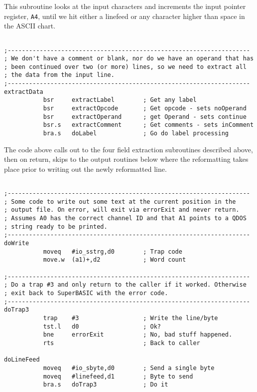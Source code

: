 This subroutine looks at the input characters and increments the input pointer register, \texttt{A4}, until we hit either a linefeed or any character higher than space in the ASCII chart.

\begin{lstlisting}[firstnumber=last,caption={ASMReformat Source - Main Extraction Control Code}]

;--------------------------------------------------------------------
; We don't have a comment or blank, nor do we have an operand that has
; been continued over two (or more) lines, so we need to extract all
; the data from the input line.
;--------------------------------------------------------------------
extractData
           bsr     extractLabel        ; Get any label
           bsr     extractOpcode       ; Get opcode - sets noOperand
           bsr     extractOperand      ; get Operand - sets continue
           bsr.s   extractComment      ; Get comments - sets inComment
           bra.s   doLabel             ; Go do label processing
\end{lstlisting}

The code above calls out to the four field extraction subroutines described above, then on return, skips to the output routines below where the reformatting takes place prior to writing out the newly reformatted line.

\begin{lstlisting}[firstnumber=last,caption={ASMReformat Source - Trap \#3 Code}]

;--------------------------------------------------------------------
; Some code to write out some text at the current position in the
; output file. On error, will exit via errorExit and never return.
; Assumes A0 has the correct channel ID and that A1 points to a QDOS
; string ready to be printed.
;--------------------------------------------------------------------
doWrite
           moveq   #io_sstrg,d0        ; Trap code
           move.w  (a1)+,d2            ; Word count

;--------------------------------------------------------------------
; Do a trap #3 and only return to the caller if it worked. Otherwise
; exit back to SuperBASIC with the error code.
;--------------------------------------------------------------------
doTrap3
           trap    #3                  ; Write the line/byte
           tst.l   d0                  ; Ok?
           bne     errorExit           ; No, bad stuff happened.
           rts                         ; Back to caller

doLineFeed
           moveq   #io_sbyte,d0        ; Send a single byte
           moveq   #linefeed,d1        ; Byte to send
           bra.s   doTrap3             ; Do it
\end{lstlisting}

